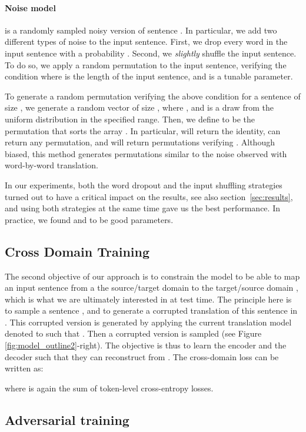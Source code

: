 \documentclass{article} \usepackage{iclr2018_conference,times}
\begin{document}
\paragraph{Noise model}  is a randomly sampled noisy version of sentence . In particular, we add two different types of noise to the input sentence. First, we drop every word in the input sentence with a probability . Second, we \textit{slightly} shuffle the input sentence. To do so, we apply a random permutation  to the input sentence, verifying the condition  where  is the length of the input sentence, and  is a tunable parameter. 

To generate a random permutation verifying the above condition for a sentence of size , we generate a random vector  of size , where , and  is a draw from the uniform distribution in the specified range. Then, we define  to be the permutation that sorts the array . In particular,  will return the identity,  can return any permutation, and  will return permutations  verifying . Although biased, this method generates permutations similar to the noise observed with word-by-word translation.

In our experiments, both the word dropout and the input shuffling strategies turned out to have a critical impact on the results, see also section~\ref{sec:results}, and using both strategies at the same time gave us the best performance. In practice, we found  and  to be good parameters.

\subsection{Cross Domain Training}

 The second objective of our approach is to constrain the model to be able to map an input sentence from a the source/target domain  to the target/source domain , which is what we are ultimately interested in at test time. The principle here is to sample a sentence , and to generate a corrupted translation of this sentence in . This corrupted version is generated by applying the current translation model denoted  to  such that . Then a corrupted version  is sampled (see Figure \ref{fig:model_outline2}-right). The objective is thus to learn the encoder and the decoder such that they can reconstruct  from . The cross-domain loss can be written as:

where  is again the sum of token-level cross-entropy losses.


\subsection{Adversarial training}
\end{document}
